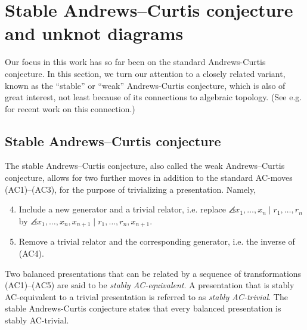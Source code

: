 
\section{Stable Andrews--Curtis conjecture and unknot diagrams}\label{sec:stable}

Our focus in this work has so far been on the standard Andrews-Curtis conjecture. In this section, we turn our attention to a closely related variant, known as the “stable” or “weak” Andrews-Curtis conjecture, which is also of great interest, not least because of its connections to algebraic topology. (See e.g. \cite{Meier2016,Bagherifard2021} for recent work on this connection.)

\subsection{Stable Andrews--Curtis conjecture} \label{subsec:stable}

The stable Andrews--Curtis conjecture, also called the weak Andrews--Curtis conjecture, allows for two further moves in addition to the standard AC-moves (AC1)--(AC3), for the purpose of trivializing a presentation. Namely,
\begin{enumerate}[label=(AC\arabic*)]
	\setcounter{enumi}{3}
	\item Include a new generator and a trivial relator, i.e. replace $\angles{x_1, \dots, x_n \mid r_1, \dots, r_n}$ by $\angles{x_1, \dots, x_n, x_{n+1} \mid r_1, \dots, r_n, x_{n+1}}$.
	\item Remove a trivial relator and the corresponding generator, i.e. the inverse of (AC4).
\end{enumerate}

Two balanced presentations that can be related by a sequence of transformations (AC1)--(AC5) are said to be \textit{stably AC-equivalent}. A presentation that is stably AC-equivalent to a trivial presentation is referred to as \emph{stably AC-trivial}. The stable Andrews-Curtis conjecture states that every balanced presentation is stably AC-trivial. 

